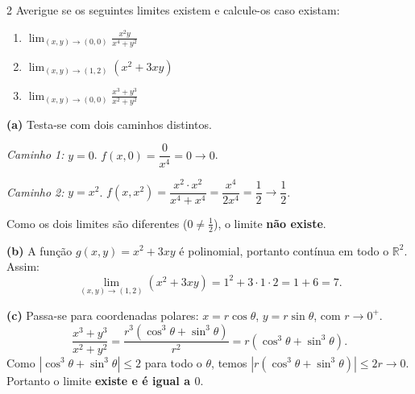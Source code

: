 \begin{exercisebox}{2}
  Averigue se os seguintes limites existem e calcule-os caso existam:
  \begin{enumerate}[label=(\alph*)]
    \item $\displaystyle\lim_{(x,y)\to(0,0)}\frac{x^2 y}{x^4+y^2}$
    \item $\displaystyle\lim_{(x,y)\to(1,2)}(x^2+3xy)$
    \item $\displaystyle\lim_{(x,y)\to(0,0)}\frac{x^3+y^3}{x^2+y^2}$
  \end{enumerate}
\end{exercisebox}
\begin{solbox}
  \textbf{(a)} Testa-se com dois caminhos distintos.

  \emph{Caminho 1:} $y=0$. $f(x,0)=\dfrac{0}{x^4}=0\to 0$.

  \emph{Caminho 2:} $y=x^2$. $f(x,x^2)=\dfrac{x^2\cdot x^2}{x^4+x^4}=\dfrac{x^4}{2x^4}=\dfrac{1}{2}\to\dfrac{1}{2}$.

  Como os dois limites são diferentes ($0\neq\tfrac{1}{2}$), o limite
  \textbf{não existe}.

  \textbf{(b)} A função $g(x,y)=x^2+3xy$ é polinomial, portanto contínua em
  todo o $\mathbb{R}^2$. Assim:
  \[
    \lim_{(x,y)\to(1,2)}(x^2+3xy) = 1^2+3\cdot 1\cdot 2 = 1+6 = 7.
  \]

  \textbf{(c)} Passa-se para coordenadas polares: $x=r\cos\theta$,
  $y=r\sin\theta$, com $r\to 0^+$.
  \[
    \frac{x^3+y^3}{x^2+y^2}
    = \frac{r^3(\cos^3\theta+\sin^3\theta)}{r^2}
    = r(\cos^3\theta+\sin^3\theta).
  \]
  Como $|\cos^3\theta+\sin^3\theta|\leq 2$ para todo o $\theta$, temos
  $\left|r(\cos^3\theta+\sin^3\theta)\right|\leq 2r\to 0$.
  Portanto o limite \textbf{existe e é igual a $0$}.
\end{solbox}


